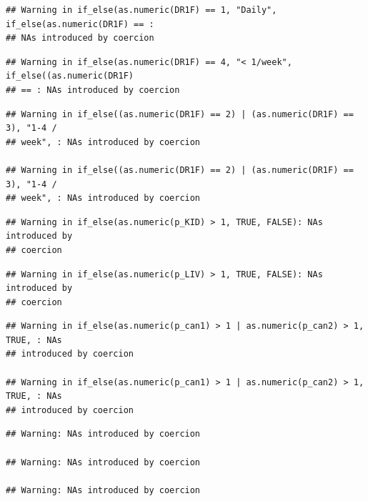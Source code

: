 \documentclass[]{article}
\newenvironment{Shaded}{\begin{snugshade}}{\end{snugshade}}
\newcommand{\DataTypeTok}[1]{\textcolor[rgb]{0.13,0.29,0.53}{#1}}
\newcommand{\DecValTok}[1]{\textcolor[rgb]{0.00,0.00,0.81}{#1}}
\newcommand{\KeywordTok}[1]{\textcolor[rgb]{0.13,0.29,0.53}{\textbf{#1}}}
\newcommand{\NormalTok}[1]{#1}
\newcommand{\OperatorTok}[1]{\textcolor[rgb]{0.81,0.36,0.00}{\textbf{#1}}}
\newcommand{\OtherTok}[1]{\textcolor[rgb]{0.56,0.35,0.01}{#1}}
\newcommand{\StringTok}[1]{\textcolor[rgb]{0.31,0.60,0.02}{#1}}
\begin{document}
\begin{verbatim}
## Warning in if_else(as.numeric(DR1F) == 1, "Daily", if_else(as.numeric(DR1F) == :
## NAs introduced by coercion
\end{verbatim}

\begin{verbatim}
## Warning in if_else(as.numeric(DR1F) == 4, "< 1/week", if_else((as.numeric(DR1F)
## == : NAs introduced by coercion
\end{verbatim}

\begin{verbatim}
## Warning in if_else((as.numeric(DR1F) == 2) | (as.numeric(DR1F) == 3), "1-4 /
## week", : NAs introduced by coercion

## Warning in if_else((as.numeric(DR1F) == 2) | (as.numeric(DR1F) == 3), "1-4 /
## week", : NAs introduced by coercion
\end{verbatim}

\begin{verbatim}
## Warning in if_else(as.numeric(p_KID) > 1, TRUE, FALSE): NAs introduced by
## coercion
\end{verbatim}

\begin{verbatim}
## Warning in if_else(as.numeric(p_LIV) > 1, TRUE, FALSE): NAs introduced by
## coercion
\end{verbatim}

\begin{verbatim}
## Warning in if_else(as.numeric(p_can1) > 1 | as.numeric(p_can2) > 1, TRUE, : NAs
## introduced by coercion

## Warning in if_else(as.numeric(p_can1) > 1 | as.numeric(p_can2) > 1, TRUE, : NAs
## introduced by coercion
\end{verbatim}

\begin{verbatim}
## Warning: NAs introduced by coercion

## Warning: NAs introduced by coercion

## Warning: NAs introduced by coercion
\end{verbatim}

\begin{Shaded}
\end{Shaded}
\end{document}
